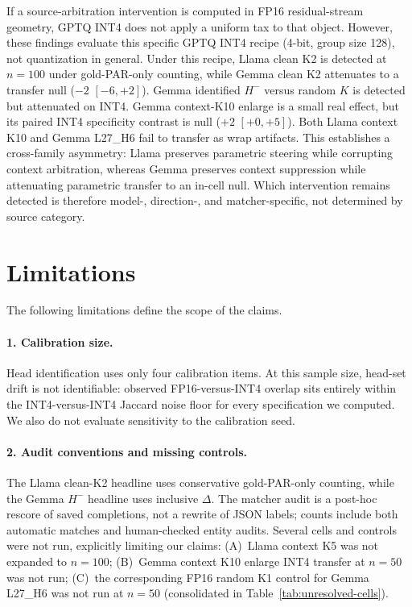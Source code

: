 \documentclass{article} %
\begin{document}
If a source-arbitration intervention is computed in FP16 residual-stream geometry, GPTQ INT4 does not apply a uniform tax to that object. However, these findings evaluate this specific GPTQ INT4 recipe (4-bit, group size 128), not quantization in general. Under this recipe, Llama clean K2 is detected at $n{=}100$ under gold-PAR-only counting, while Gemma clean K2 attenuates to a transfer null ($-2$ $[-6,+2]$). Gemma identified $H^{-}$ versus random $K$ is detected but attenuated on INT4. Gemma context-K10 enlarge is a small real effect, but its paired INT4 specificity contrast is null ($+2$ $[+0,+5]$). Both Llama context K10 and Gemma L27\_H6 fail to transfer as wrap artifacts. This establishes a cross-family asymmetry: Llama preserves parametric steering while corrupting context arbitration, whereas Gemma preserves context suppression while attenuating parametric transfer to an in-cell null. Which intervention remains detected is therefore model-, direction-, and matcher-specific, not determined by source category.

\section{Limitations}
\label{sec:limitations}

The following limitations define the scope of the claims.

\paragraph{1. Calibration size.} Head identification uses only four calibration items. At this sample size, head-set drift is not identifiable: observed FP16-versus-INT4 overlap sits entirely within the INT4-versus-INT4 Jaccard noise floor for every specification we computed. We also do not evaluate sensitivity to the calibration seed.

\paragraph{2. Audit conventions and missing controls.} The Llama clean-K2 headline uses conservative gold-PAR-only counting, while the Gemma $H^{-}$ headline uses inclusive $\Delta$. The matcher audit is a post-hoc rescore of saved completions, not a rewrite of JSON labels; counts include both automatic matches and human-checked entity audits. Several cells and controls were not run, explicitly limiting our claims: (A)~Llama context K5 was not expanded to $n{=}100$; (B)~Gemma context K10 enlarge INT4 transfer at $n{=}50$ was not run; (C)~the corresponding FP16 random K1 control for Gemma L27\_H6 was not run at $n{=}50$ (consolidated in Table~\ref{tab:unresolved-cells}).
\end{document}
